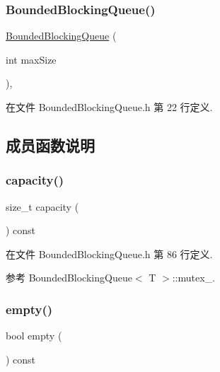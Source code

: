 \subsubsection{\texorpdfstring{Bounded\+Blocking\+Queue()}{BoundedBlockingQueue()}}
{\footnotesize\ttfamily \hyperlink{classmuduo_1_1BoundedBlockingQueue}{Bounded\+Blocking\+Queue} (\begin{DoxyParamCaption}\item[{int}]{max\+Size }\end{DoxyParamCaption})\hspace{0.3cm}{\ttfamily [inline]}, {\ttfamily [explicit]}}



在文件 Bounded\+Blocking\+Queue.\+h 第 22 行定义.



\subsection{成员函数说明}
\mbox{\label{classmuduo_1_1BoundedBlockingQueue_a7223528283cd4e5872e0cc716bf9bd9d}} 
\subsubsection{\texorpdfstring{capacity()}{capacity()}}
{\footnotesize\ttfamily size\+\_\+t capacity (\begin{DoxyParamCaption}{ }\end{DoxyParamCaption}) const\hspace{0.3cm}{\ttfamily [inline]}}



在文件 Bounded\+Blocking\+Queue.\+h 第 86 行定义.



参考 Bounded\+Blocking\+Queue$<$ T $>$\+::mutex\+\_\+.

\mbox{\label{classmuduo_1_1BoundedBlockingQueue_a644718bb2fb240de962dc3c9a1fdf0dc}} 
\subsubsection{\texorpdfstring{empty()}{empty()}}
{\footnotesize\ttfamily bool empty (\begin{DoxyParamCaption}{ }\end{DoxyParamCaption}) const\hspace{0.3cm}{\ttfamily [inline]}}



